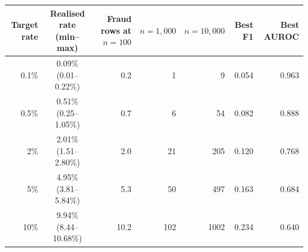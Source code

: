 \begin{tabular}{rcrrrrr}\toprule
Target rate & Realised rate (min--max) & Fraud rows at $n{=}100$ & $n{=}1{,}000$ & $n{=}10{,}000$ & Best F1 & Best AUROC\\\midrule
0.1\% & 0.09\% (0.01--0.22\%) & 0.2 & 1 & 9 & 0.054 & 0.963\\
0.5\% & 0.51\% (0.25--1.05\%) & 0.7 & 6 & 54 & 0.082 & 0.888\\
2\% & 2.01\% (1.51--2.80\%) & 2.0 & 21 & 205 & 0.120 & 0.768\\
5\% & 4.95\% (3.81--5.84\%) & 5.3 & 50 & 497 & 0.163 & 0.684\\
10\% & 9.94\% (8.44--10.68\%) & 10.2 & 102 & 1002 & 0.234 & 0.640\\
\bottomrule\end{tabular}
